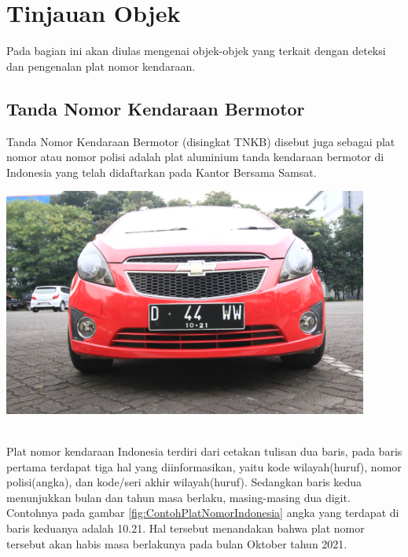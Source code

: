 \section{Tinjauan Objek}
\noindent Pada bagian ini akan diulas mengenai objek-objek yang terkait dengan deteksi dan pengenalan plat nomor kendaraan.\\

\subsection{Tanda Nomor Kendaraan Bermotor}
\noindent Tanda Nomor Kendaraan Bermotor (disingkat TNKB) disebut juga sebagai plat nomor atau nomor polisi adalah plat aluminium tanda kendaraan bermotor di Indonesia yang telah didaftarkan pada Kantor Bersama Samsat.

\begin{adjustbox}{width=1\textwidth}
\noindent\begin{minipage}{\linewidth}
	\centering\includegraphics[width=12cm]{images/plat_nomor_example.png}
	\label{fig:ContohPlatNomorIndonesia}
\end{minipage}
\end{adjustbox}\\

\noindent Plat nomor kendaraan Indonesia terdiri dari cetakan tulisan dua baris, pada baris pertama terdapat tiga hal yang diinformasikan, yaitu kode wilayah(huruf), nomor polisi(angka), dan kode/seri akhir wilayah(huruf). Sedangkan baris kedua menunjukkan bulan dan tahun masa berlaku, masing-masing dua digit. Contohnya pada gambar \ref{fig:ContohPlatNomorIndonesia} angka yang terdapat di baris keduanya adalah 10.21. Hal tersebut menandakan bahwa plat nomor tersebut akan habis masa berlakunya pada bulan Oktober tahun 2021.

